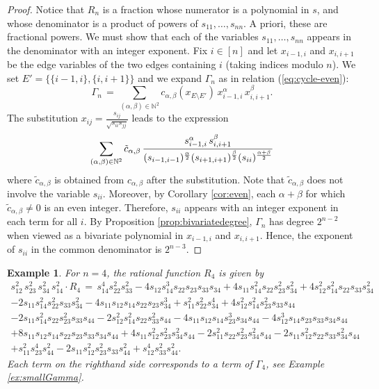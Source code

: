 \documentclass[a4paper, 11pt, twoside]{article}
\theoremstyle{plain}
\newtheorem{example}[theorem]{Example}
\begin{document}
\begin{proof}
    Notice that $R_n$ is a fraction whose numerator is a polynomial in $s$, and whose denominator is a product of powers of $s_{11}, \ldots, s_{nn}$. A priori, these are fractional powers. We must show that each of the variables $s_{11}, \ldots, s_{nn}$ appears in the denominator with an integer exponent. Fix $i \in [n]$ and let $x_{i-1,i}$ and $ x_{i,i+1}$ be the edge variables of the two edges containing $i$ (taking indices modulo $n$). We set $E' = \{\{i-1,i\},\{i,i+1\}\}$ and we expand $\Gamma_n$ as in relation (\ref{eq:cycle-even}):
    \[ \Gamma_n \, = \, \sum_{(\alpha,\beta) \in \mathbb{N}^2} c_{\alpha,\beta}(x_{E \setminus E'}) \, x_{i-1,i}^\alpha \, x_{i,i+1}^\beta .\]
    The substitution $x_{ij} = \frac{s_{ij}}{\sqrt{s_{ii}s_{jj}}}$ leads to the expression 
    \[ \sum_{(\alpha,\beta) \in \mathbb{N}^2} \tilde{c}_{\alpha,\beta} \, 
    \frac{s_{i-1,i}^\alpha \, s_{i,i+1}^\beta}
    { (s_{i-1,i-1})^{\alpha\over 2} (s_{i+1,i+1})^{\beta\over 2} (s_{ii})^{\alpha+\beta\over 2} }
    \]
    where $\tilde{c}_{\alpha, \beta}$ is obtained from $c_{\alpha,\beta}$ after the substitution. Note that $\tilde{c}_{\alpha, \beta}$ does not involve the variable $s_{ii}$. 
    Moreover, by Corollary \ref{cor:even}, each $\alpha + \beta$ for which $\tilde{c}_{\alpha, \beta} \neq 0$ is an even integer. Therefore, $s_{ii}$ appears with an integer exponent in each term for all $i$. By Proposition \ref{prop:bivariatedegree}, $\Gamma_n$ has degree $2^{n-2}$ when viewed as a bivariate polynomial in $x_{i-1,i}$ and $ x_{i,i+1}$. Hence,  the exponent of $s_{ii}$ in the common denominator is $2^{n-3}$. 
\end{proof}

\begin{example}
For $n = 4$, the rational function $R_4$ is given by 
\[\begin{matrix} s_{12}^2 \, s_{23}^2 \, s_{34}^2 \, s_{14}^2 \cdot R_4 \, = \, s_{14}^4 s_{22}^2 s_{33}^2 - 4 s_{12} s_{14}^3 s_{22} s_{23} s_{33} s_{34} + 
 4 s_{11} s_{14}^2 s_{22} s_{23}^2 s_{34}^2 + 4 s_{12}^2 s_{14}^2 s_{22} s_{33} s_{34}^2 \\- 
 2 s_{11} s_{14}^2 s_{22}^2 s_{33} s_{34}^2 - 4 s_{11} s_{12} s_{14} s_{22} s_{23} s_{34}^3 + 
 s_{11}^2 s_{22}^2 s_{34}^4 + 4 s_{12}^2 s_{14}^2 s_{23}^2 s_{33} s_{44} \\ - 
 2 s_{11} s_{14}^2 s_{22} s_{23}^2 s_{33} s_{44} - 2 s_{12}^2 s_{14}^2 s_{22} s_{33}^2 s_{44} - 
 4 s_{11} s_{12} s_{14} s_{23}^3 s_{34} s_{44} - 4 s_{12}^3 s_{14} s_{23} s_{33} s_{34} s_{44} \\+ 
 8 s_{11} s_{12} s_{14} s_{22} s_{23} s_{33} s_{34} s_{44} + 4 s_{11} s_{12}^2 s_{23}^2 s_{34}^2 s_{44} - 
 2 s_{11}^2 s_{22} s_{23}^2 s_{34}^2 s_{44} - 2 s_{11} s_{12}^2 s_{22} s_{33} s_{34}^2 s_{44} \\ + 
 s_{11}^2 s_{23}^4 s_{44}^2 - 2 s_{11} s_{12}^2 s_{23}^2 s_{33} s_{44}^2 + s_{12}^4 s_{33}^2 s_{44}^2. \end{matrix} \]
 Each term on the righthand side corresponds to a term of $\Gamma_4$, see Example \ref{ex:smallGamma}.
\end{example}
\end{document}
